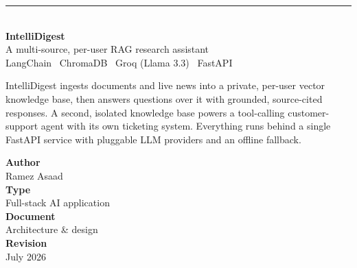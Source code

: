 \documentclass[11pt]{article}
\begin{document}
\thispagestyle{empty}

\begin{flushleft}
{\color{accent}\rule{34mm}{2.6pt}}\\[10mm]
{\sffamily\bfseries\fontsize{40}{44}\selectfont\color{ink} IntelliDigest}\\[3mm]
{\sffamily\Large\color{subink} A multi-source, per-user RAG research assistant}\\[2mm]
{\sffamily\normalsize\color{slate} LangChain \textbullet\ ChromaDB \textbullet\ Groq (Llama 3.3) \textbullet\ FastAPI}\\[16mm]
\end{flushleft}

\noindent
\begin{minipage}[t]{0.62\textwidth}
\small\color{subink}
IntelliDigest ingests documents and live news into a private, per-user vector
knowledge base, then answers questions over it with grounded, source-cited
responses. A second, isolated knowledge base powers a tool-calling customer-support
agent with its own ticketing system. Everything runs behind a single FastAPI
service with pluggable LLM providers and an offline fallback.
\end{minipage}\hfill
\begin{minipage}[t]{0.32\textwidth}
\small
\color{slate}\sffamily
\textbf{\color{ink}Author}\\ Ramez Asaad\\[4pt]
\textbf{\color{ink}Type}\\ Full-stack AI application\\[4pt]
\textbf{\color{ink}Document}\\ Architecture \& design\\[4pt]
\textbf{\color{ink}Revision}\\ July 2026
\end{minipage}

\vspace{12mm}
\end{document}
